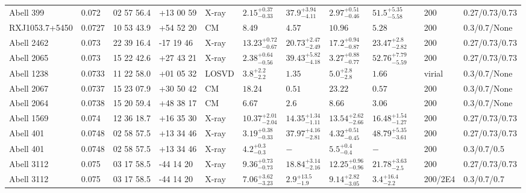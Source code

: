 \begin{landscape}
\begin{center}
{\begin{longtable}{llllllllllll}
Abell 399 & 0.072 & 02 57 56.4 & +13 00 59 & X-ray & ${2.15}^{+0.37}_{-0.33}$ & ${37.9}^{+3.94}_{-4.11}$ & ${2.97}^{+0.51}_{-0.46}$ & ${51.5}^{+5.35}_{-5.58}$ & \citet{BA14.1} & 200 & 0.27/0.73/0.73 \\
RXJ1053.7+5450 & 0.0727 & 10 53 43.9 & +54 52 20 & CM & ${8.49}^{}_{}$ & ${4.57}^{}_{}$ & ${10.96}^{}_{}$ & ${5.28}^{}_{}$ & \citet{RI06.1} & 200 & 0.3/0.7/None \\
Abell 2462 & 0.073 & 22 39 16.4 & -17 19 46 & X-ray & ${13.23}^{+0.72}_{-0.67}$ & ${20.73}^{+2.47}_{-2.49}$ & ${17.2}^{+0.94}_{-0.87}$ & ${23.47}^{+2.8}_{-2.82}$ & \citet{BA14.1} & 200 & 0.27/0.73/0.73 \\
Abell 2065 & 0.073 & 15 22 42.6 & +27 43 21 & X-ray & ${2.38}^{+0.64}_{-0.56}$ & ${39.43}^{+5.82}_{-4.18}$ & ${3.27}^{+0.88}_{-0.77}$ & ${52.76}^{+7.79}_{-5.59}$ & \citet{BA14.1} & 200 & 0.27/0.73/0.73 \\
Abell 1238 & 0.0733 & 11 22 58.0 & +01 05 32 & LOSVD & ${3.8}^{+2.2}_{-2.2}$ & ${1.35}^{}_{}$ & ${5.0}^{+2.8}_{-2.8}$ & ${1.66}^{}_{}$ & \citet{AB11.1} & virial & 0.3/0.7/None \\
Abell 2067 & 0.0737 & 15 23 07.9 & +30 50 42 & CM & ${18.24}^{}_{}$ & ${0.51}^{}_{}$ & ${23.22}^{}_{}$ & ${0.57}^{}_{}$ & \citet{RI06.1} & 200 & 0.3/0.7/None \\
Abell 2064 & 0.0738 & 15 20 59.4 & +48 38 17 & CM & ${6.67}^{}_{}$ & ${2.6}^{}_{}$ & ${8.66}^{}_{}$ & ${3.06}^{}_{}$ & \citet{RI06.1} & 200 & 0.3/0.7/None \\
Abell 1569 & 0.074 & 12 36 18.7 & +16 35 30 & X-ray & ${10.37}^{+2.01}_{-2.04}$ & ${14.35}^{+1.34}_{-1.11}$ & ${13.54}^{+2.62}_{-2.66}$ & ${16.48}^{+1.54}_{-1.27}$ & \citet{BA14.1} & 200 & 0.27/0.73/0.73 \\
Abell 401 & 0.0748 & 02 58 57.5 & +13 34 46 & X-ray & ${3.19}^{+0.38}_{-0.33}$ & ${37.97}^{+4.16}_{-2.81}$ & ${4.32}^{+0.51}_{-0.45}$ & ${48.79}^{+5.35}_{-3.61}$ & \citet{BA14.1} & 200 & 0.27/0.73/0.73 \\
Abell 401 & 0.0748 & 02 58 57.5 & +13 34 46 & X-ray & ${4.2}^{+0.3}_{-0.3}$ & ${-}^{}_{}$ & ${5.5}^{+0.4}_{-0.4}$ & ${-}^{}_{}$ & \citet{XU01.1} & 200 & 0.3/0.7/0.5 \\
Abell 3112 & 0.075 & 03 17 58.5 & -44 14 20 & X-ray & ${9.36}^{+0.73}_{-0.73}$ & ${18.84}^{+3.14}_{-2.16}$ & ${12.25}^{+0.96}_{-0.96}$ & ${21.78}^{+3.63}_{-2.5}$ & \citet{BA14.1} & 200 & 0.27/0.73/0.73 \\
Abell 3112 & 0.075 & 03 17 58.5 & -44 14 20 & X-ray & ${7.06}^{+3.62}_{-3.23}$ & ${2.9}^{+13.5}_{-1.9}$ & ${9.14}^{+2.82}_{-3.05}$ & ${3.4}^{+16.4}_{-2.2}$ & \citet{VO06.1} & 200/2E4 & 0.3/0.7/0.7 \\

\end{longtable}}
\end{center}
\end{landscape}
